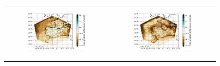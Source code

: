 \begin{figure}[htbp]
    \centering
    \begin{tabular}{cc}
        \begin{subfigure}[b]{0.33\textwidth}
            \caption{}
            \includegraphics[width=\textwidth]{images/chap4/forcing_sampling_freq/diff_map_precip_era_era.png}
        \end{subfigure} &
        \begin{subfigure}[b]{0.33\textwidth}
            \caption{}
            \includegraphics[width=\textwidth]{images/chap4/forcing_sampling_freq/diff_map_precip_ico_era.png}
        \end{subfigure} \\
        

\end{tabular}
\end{figure}
